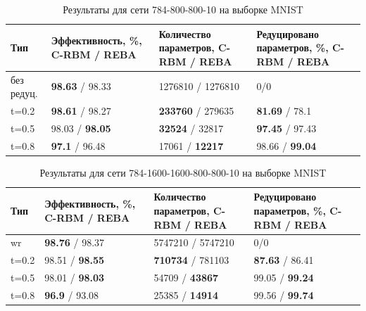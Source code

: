 \begin{table} [!h]
  \small
  \caption{Результаты для сети 784-800-800-10 на выборке MNIST}\label{table:mnist_1}
\centering
\begin{tabular}{| p{2cm} | p{4cm} | p{4cm} | p{4cm} |}
  \hline
    \textbf{Тип} & \textbf{Эффективность, \%, C-RBM / REBA} & \textbf{Количество параметров, C-RBM / REBA} & \textbf{Редуцировано параметров, \%, C-RBM / REBA}\\
    \hline
    без редуц. & \textbf{98.63} / 98.33 & 1276810 / 1276810 & 0/0\\
    \hline
    t=0.2 & \textbf{98.61} / 98.27 & \textbf{233760} / 279635 & \textbf{81.69} / 78.1\\
    \hline
    t=0.5 & 98.03 / \textbf{98.05} & \textbf{32524} / 32817 & \textbf{97.45} / 97.43\\
    \hline
    t=0.8 & \textbf{97.1} / 96.48 & 17061 / \textbf{12217} & 98.66 / \textbf{99.04}\\
    \hline
\end{tabular}
\end{table}

\begin{table} [!h]
  \small
  \caption{Результаты для сети 784-1600-1600-800-800-10 на выборке MNIST}\label{table:mnist_2}
\centering
\begin{tabular}{| p{2cm} | p{4cm} | p{4cm} | p{4cm} |}
  \hline
    \textbf{Тип} & \textbf{Эффективность, \%, C-RBM / REBA} & \textbf{Количество параметров, C-RBM / REBA} & \textbf{Редуцировано параметров, \%, C-RBM / REBA}\\
    \hline
    wr & \textbf{98.76} / 98.37 & 5747210 / 5747210 & 0/0\\
    \hline
    t=0.2 & 98.51 / \textbf{98.55} & \textbf{710734} / 781103 & \textbf{87.63} / 86.41\\
    \hline
    t=0.5 & 98.01 / \textbf{98.03} & 54709 / \textbf{43867} & 99.05 / \textbf{99.24}\\
    \hline
    t=0.8 & \textbf{96.9} / 93.08 & 25385 / \textbf{14914} & 99.56 / \textbf{99.74}\\
    \hline
\end{tabular}
\end{table}

